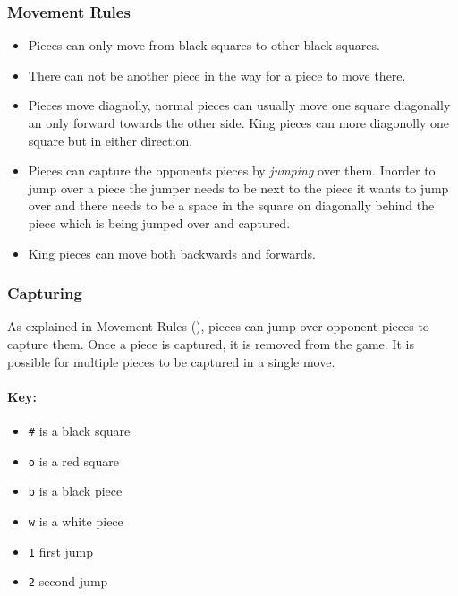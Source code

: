 \subsubsection{Movement Rules}\label{subsec:movement-rules}
\begin{itemize}
\item
  Pieces can only move from black squares to other black squares.
\item
  There can not be another piece in the way for a piece to move there.
\item
  Pieces move diagnolly, normal pieces can usually move one square diagonally
  an only forward towards the other side. King pieces can more diagonolly one
  square but in either direction.
\item
  Pieces can capture the opponents pieces by \emph{jumping} over them.  Inorder
  to jump over a piece the jumper needs to be next to the piece it wants to
  jump over and there needs to be a space in the square on diagonally behind
  the piece which is being jumped over and captured.
\item
  King pieces can move both backwards and forwards.
\end{itemize}

\subsubsection{Capturing}
As explained in Movement Rules (), pieces can
jump over opponent pieces to capture them. Once a piece is captured, it is
removed from the game. It is possible for multiple pieces to be captured in a
single move.

\paragraph{Key:}{%
  \begin{itemize}
    \item \texttt{\#} is a black square
    \item \texttt{o} is a red square
    \item \texttt{b} is a black piece
    \item \texttt{w} is a white piece
    \item \texttt{1} first jump
    \item \texttt{2} second jump
  \end{itemize}
}

